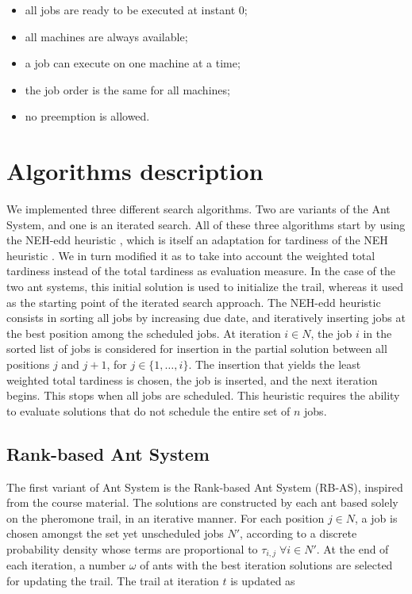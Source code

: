 \documentclass[runningheads]{llncs}
\begin{document}
\begin{itemize}
	\item all jobs are ready to be executed at instant 0;
	\item all machines are always available;
	\item a job can execute on one machine at a time;
	\item the job order is the same for all machines;
	\item no preemption is allowed.
\end{itemize}


\section{Algorithms description}
\label{sec:algo}

We implemented three different search algorithms. Two are variants of the Ant
System, and one is an iterated search. All of these three algorithms start by
using the NEH-edd heuristic \cite{kim1993new}, which is itself an adaptation for
tardiness of the NEH heuristic \cite{nawaz1983heuristic}. We in turn modified it
as to take into account the weighted total tardiness instead of the total
tardiness as evaluation measure. In the case of the two ant systems, this
initial solution is used to initialize the trail, whereas it used as the
starting point of the iterated search approach. The NEH-edd heuristic consists
in sorting all jobs by increasing due date, and iteratively inserting jobs at
the best position among the scheduled jobs. At iteration $i\in N$, the job $i$
in the sorted list of jobs is considered for insertion in the partial solution
between all positions $j$ and $j+1$, for $j\in\{1,\dots,i\}$. The insertion that
yields the least weighted total tardiness is chosen, the job is inserted, and
the next iteration begins. This stops when all jobs are scheduled. This
heuristic requires the ability to evaluate solutions that do not schedule the
entire set of $n$ jobs.

\subsection{Rank-based Ant System}

The first variant of Ant System is the Rank-based Ant System (RB-AS), inspired
from the course material. The solutions are constructed by each ant based solely
on the pheromone trail, in an iterative manner. For each position $j\in N$, a
job is chosen amongst the set yet unscheduled jobs $N'$, according to a discrete
probability density whose terms are proportional to $\tau_{i,j}\;\forall i\in
N'$. At the end of each iteration, a number $\omega$ of ants with the best
iteration solutions are selected for updating the trail. The trail at iteration
$t$ is updated as
\end{document}
